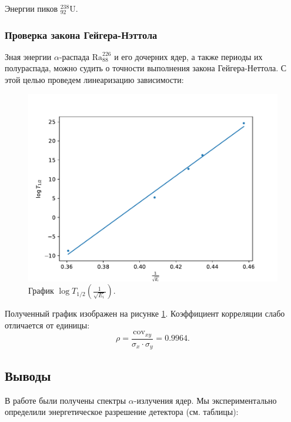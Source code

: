 \documentclass[10pt,a4paper]{article}
\newcommand{\elem}[3]{{}^{#2}_{#3}\text{#1}}
\newcommand{\Ua}{\elem{U}{238}{92}}
\begin{document}
\begin{multicols}{2}
	\vspace*{-1cm}
	
	\begin{table}[H]
		\addtolength{\tabcolsep}{-4pt}
		\footnotesize
		
		\caption{Энергии пиков $\Ua$.}
		\label{tab:u}
	\end{table}
	
	\subsubsection*{Проверка закона Гейгера-Нэттола}
		
	Зная энергии $\alpha$-распада $\text{Ra}_{88}^{226}$ и его дочерних ядер, а также периоды их полураспада, можно судить о точности выполнения закона Гейгера-Неттола. С этой целью проведем линеаризацию зависимости:
	
	\begin{figure}[H]
		\includegraphics[width=1\textwidth]{gen/fig-te.pdf}
		\caption{График $\log{T_{1/2}} \left( \frac{1}{\sqrt{E_i}}\right)$.}
		\label{fig:te}
	\end{figure}

	Полученный график изображен на рисунке \ref{fig:te}. Коэффициент корреляции слабо отличается от единицы: 
	$$ \rho = \frac{ \text{cov}_{ xy } }{ \sigma_x \cdot \sigma_y} = 0.9964. $$
	
	\subsection*{Выводы}
	
	В работе были получены спектры $\alpha$-излучения ядер. Мы экспериментально определили энергетическое разрешение детектора (см. таблицы):
	

\end{multicols}
\end{document}

